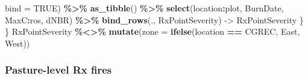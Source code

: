 \documentclass[
]{article}
\newenvironment{Shaded}{\begin{snugshade}}{\end{snugshade}}
\newcommand{\AttributeTok}[1]{\textcolor[rgb]{0.13,0.29,0.53}{#1}}
\newcommand{\ConstantTok}[1]{\textcolor[rgb]{0.56,0.35,0.01}{#1}}
\newcommand{\FunctionTok}[1]{\textcolor[rgb]{0.13,0.29,0.53}{\textbf{#1}}}
\newcommand{\NormalTok}[1]{#1}
\newcommand{\OtherTok}[1]{\textcolor[rgb]{0.56,0.35,0.01}{#1}}
\newcommand{\SpecialCharTok}[1]{\textcolor[rgb]{0.81,0.36,0.00}{\textbf{#1}}}
\newcommand{\StringTok}[1]{\textcolor[rgb]{0.31,0.60,0.02}{#1}}
\begin{document}
\begin{Shaded}
\begin{Highlighting}[]
                           \AttributeTok{bind =} \ConstantTok{TRUE}\NormalTok{)  }\SpecialCharTok{\%\textgreater{}\%} 
            \FunctionTok{as\_tibble}\NormalTok{() }\SpecialCharTok{\%\textgreater{}\%} 
              \FunctionTok{select}\NormalTok{(location}\SpecialCharTok{:}\NormalTok{plot, BurnDate, MaxC}\SpecialCharTok{:}\NormalTok{ros, dNBR) }\SpecialCharTok{\%\textgreater{}\%}
            \FunctionTok{bind\_rows}\NormalTok{(., RxPointSeverity) }\OtherTok{{-}\textgreater{}}\NormalTok{ RxPointSeverity}
\NormalTok{\}}
\NormalTok{\}}
\NormalTok{RxPointSeverity }\SpecialCharTok{\%\textless{}\textgreater{}\%}
  \FunctionTok{mutate}\NormalTok{(}\AttributeTok{zone =} \FunctionTok{ifelse}\NormalTok{(location }\SpecialCharTok{==} \StringTok{\textquotesingle{}CGREC\textquotesingle{}}\NormalTok{, }\StringTok{\textquotesingle{}East\textquotesingle{}}\NormalTok{, }\StringTok{\textquotesingle{}West\textquotesingle{}}\NormalTok{)) }
\end{Highlighting}
\end{Shaded}

\subsubsection{Pasture-level Rx fires}\label{pasture-level-rx-fires}
\end{document}
